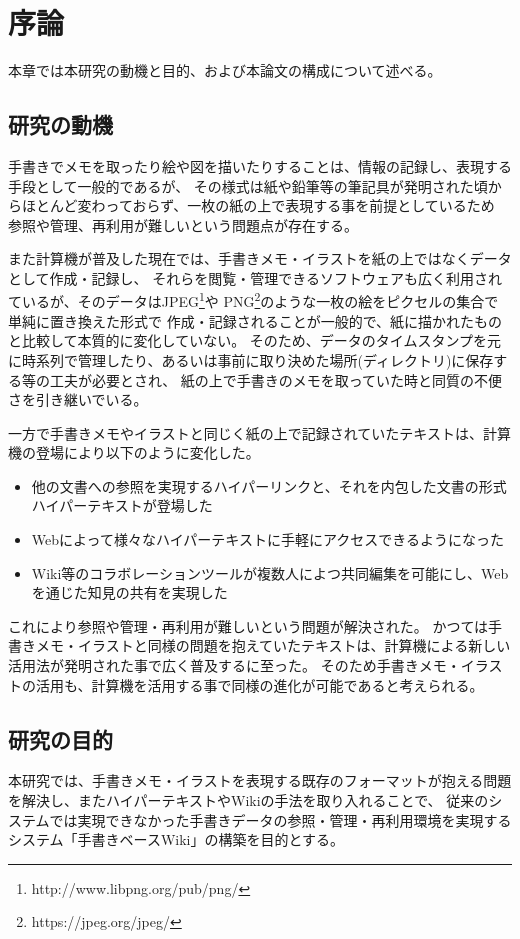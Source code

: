 \chapter{序論}
\label{chap:introduction}

本章では本研究の動機と目的、および本論文の構成について述べる。

\newpage

\section{研究の動機}

手書きでメモを取ったり絵や図を描いたりすることは、情報の記録し、表現する手段として一般的であるが、
その様式は紙や鉛筆等の筆記具が発明された頃からほとんど変わっておらず、一枚の紙の上で表現する事を前提としているため
参照や管理、再利用が難しいという問題点が存在する。

また計算機が普及した現在では、手書きメモ・イラストを紙の上ではなくデータとして作成・記録し、
それらを閲覧・管理できるソフトウェアも広く利用されているが、そのデータはJPEG\footnote{http://www.libpng.org/pub/png/}や
PNG\footnote{https://jpeg.org/jpeg/}のような一枚の絵をピクセルの集合で単純に置き換えた形式で
作成・記録されることが一般的で、紙に描かれたものと比較して本質的に変化していない。
そのため、データのタイムスタンプを元に時系列で管理したり、あるいは事前に取り決めた場所(ディレクトリ)に保存する等の工夫が必要とされ、
紙の上で手書きのメモを取っていた時と同質の不便さを引き継いでいる。

一方で手書きメモやイラストと同じく紙の上で記録されていたテキストは、計算機の登場により以下のように変化した。

\begin{itemize}
    \item 他の文書への参照を実現するハイパーリンクと、それを内包した文書の形式ハイパーテキストが登場した
    \item Webによって様々なハイパーテキストに手軽にアクセスできるようになった
    \item Wiki等のコラボレーションツールが複数人によつ共同編集を可能にし、Webを通じた知見の共有を実現した
\end{itemize}

これにより参照や管理・再利用が難しいという問題が解決された。
かつては手書きメモ・イラストと同様の問題を抱えていたテキストは、計算機による新しい活用法が発明された事で広く普及するに至った。
そのため手書きメモ・イラストの活用も、計算機を活用する事で同様の進化が可能であると考えられる。

\section{研究の目的}
本研究では、手書きメモ・イラストを表現する既存のフォーマットが抱える問題を解決し、またハイパーテキストやWikiの手法を取り入れることで、
従来のシステムでは実現できなかった手書きデータの参照・管理・再利用環境を実現するシステム「手書きベースWiki」の構築を目的とする。

